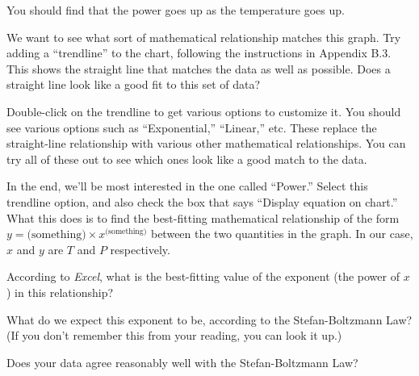 You should find that the power goes up as the temperature goes up.

We want to see what sort of mathematical relationship matches this graph. 
Try adding a ``trendline'' to the chart, following the instructions
in Appendix B.3.
This shows the straight line
that matches the data as well as possible. Does a straight line look
like a good fit to this set of data?

\vskip 1in

Double-click on the trendline to get various options to customize it.
You should see various options such as ``Exponential,'' ``Linear,'' etc.
These replace the straight-line relationship with various other 
mathematical relationships. You can try all of these out to see
which ones look like a good match to the data.

In the end, we'll be most interested in the one called ``Power.'' Select
this trendline option, and also check the box that says ``Display
equation on chart.'' What this does is to find the best-fitting mathematical
relationship of the form $y=\mbox{(something)}\times x^{\mbox{(something)}}$
between the two quantities in the graph. In our case, $x$ and $y$
are $T$ and $P$ respectively.

According to \textit{Excel}, what is the best-fitting value
of the exponent (the power of $x$) in this relationship?

\vskip 1in

What do we expect this exponent to be, according to the Stefan-Boltzmann
Law? (If you don't remember this from your reading, you can look it up.)

\vskip 1in

Does your data agree reasonably well with the Stefan-Boltzmann Law?


\newpage

